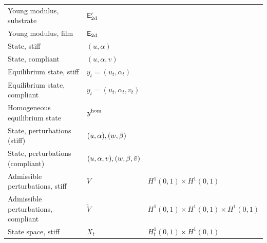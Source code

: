 \documentclass[10pt]{article}
\begin{document}
\begin{table}[h!]
\begin{tabular}{  m{6.5cm}  m{3cm}  m{5cm}  }
        Young modulus, substrate            & ${\mathsf{E_{\text{2d}}'}}$                                       &                                                                                 \\
        Young modulus, film                 & $\mathsf{E_{\text{2d}}}$                                       &                                                                                 \\
        State, stiff                        & $(u, \alpha)$                                      &                                                                                 \\
        State, compliant                    & $(u, \alpha, v)$                                   &                                                                                 \\
        Equilibrium state, stiff            & $y_t=(u_t, \alpha_t)$                              &                                                                                 \\
        Equilibrium state, compliant        & $y_t=(u_t, \alpha_t, v_t)$                         &                                                                                 \\
        Homogeneous equilibrium state       & $y^{\text{hom}}$                                            &                                                                                 \\
        State, perturbations (stiff)        & $(u,\alpha), (w, \beta)$                      &                                                                                 \\
        State, perturbations (compliant)    & $(u, \alpha, v), (w, \beta, \tilde v)$ &                                                                                 \\
        Admissible perturbations, stiff     & $V$                                                & $H^1(0,1)\times  H^1(0,1)$                                                      \\
        Admissible perturbations, compliant & $\widetilde{V}$                                    & $H^1(0,1)\times  H^1(0,1)\times  H^1(0,1)$                                      \\
        State space, stiff                  & $X_t$                                              & $H^1_t(0,1)\times  H^1(0,1)$                                                    \\

\end{tabular}
\end{table}
\end{document}
